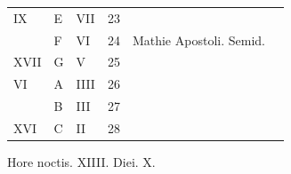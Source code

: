 \begin{center}
\begin{tabular}{l | l | l | r | l l}
\color{Red} IX & E & \color{Red} VII & 23 & & \color{Red} \\
\color{Red}  & F & \color{Red} VI & 24 & Mathie Apostoli. Semid. \\
\color{Red} XVII & G & \color{Red} V & 25 & & \color{Red} \\
\color{Red} VI & \color{Red} A & \color{Red} IIII & 26 & & \color{Red} \\
\color{Red}  & B & \color{Red} III & 27 & & \color{Red} \\
\color{Red} XVI & C & \color{Red} II & 28 & & \color{Red} \\
\end{tabular}
\newline \color{Red} Hore noctis. XIIII. Diei. X.
\end{center}



\newpage
\color{Red}\color{black}

